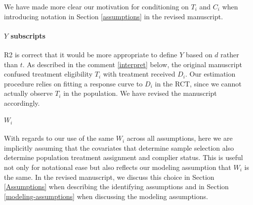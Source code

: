 \documentclass[hidelinks,12pt,letterpaper]{article}
\begin{document}
We have made more clear our motivation for conditioning on  $T_i$ and $C_i$ when introducing notation in Section \ref{assumptions} in the revised manuscript. 

\paragraph{$Y$ subscripts}

R2 is correct that it would be more appropriate to define $Y$ based on $d$ rather than $t$. As described in the comment \ref{interpret} below, the original manuscript confused treatment eligibility $T_i$ with treatment received $D_i$. Our estimation procedure relies on fitting a response curve to $D_i$ in the RCT, since we cannot actually observe $T_i$ in the population. We have revised the manuscript accordingly. 

\paragraph{$W_i$} \label{Wi}

With regards to our use of the same $W_i$ across all assumptions, here we are implicitly assuming that the covariates that determine sample selection also determine population treatment assignment and complier status. This is useful not only for notational ease but also reflects our modeling assumption that $W_i$ is the same. In the revised manuscript, we discuss this choice in Section \ref{Assumptions} when describing the identifying assumptions and in Section \ref{modeling-assumptions} when discussing the modeling assumptions. 
\end{document}
